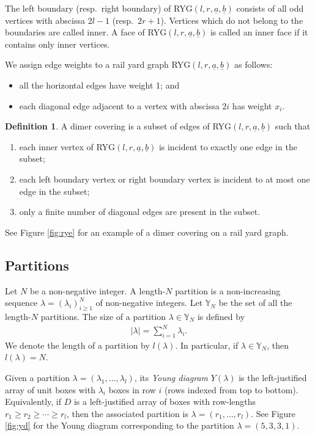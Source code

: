 \documentclass[11pt]{amsart}
\theoremstyle{plain}
\theoremstyle{definition}
\newtheorem{definition}[theorem]{Definition}
\theoremstyle{remark}
\renewcommand\ell{l}
\newcommand\YY{\mathbb{Y}}
\numberwithin{equation}{section}
\numberwithin{theorem}{section}
\numberwithin{figure}{section}
\begin{document}
The left boundary (resp.\ right boundary) of RYG$ (l,r,\underline{a},\underline{b})$ consists of all odd vertices with abscissa $2l-1$ (resp.\ $2r+1$). Vertices which do not belong to the boundaries are called inner. A face of RYG$(l,r,\underline{a},\underline{b})$ is called an inner face if it contains only inner vertices.

We assign edge weights to a rail yard graph RYG$(l,r,\underline{a},\underline{b})$ as follows:
\begin{itemize}
    \item all the horizontal edges have weight 1; and
    \item each diagonal edge adjacent to a vertex with abscissa $2i$ has weight $x_i$.
\end{itemize}



\begin{definition}
A dimer covering is a subset of edges of RYG$(l,r,\underline{a},\underline{b})$ such that
\begin{enumerate}
\item each inner vertex of RYG$(l,r,\underline{a},\underline{b})$ is incident to exactly one edge in the subset;
\item each left boundary vertex or right boundary vertex is incident to at most one edge in the subset;
\item only a finite number of diagonal edges are present in the subset.
\end{enumerate}
\end{definition}

See Figure \ref{fig:rye} for an example of a dimer covering on a rail yard graph. 


\subsection{Partitions}

Let $N$ be a non-negative integer. A length-$N$ partition is a non-increasing sequence $\lambda=(\lambda_i)_{i\geq 1}^{N}$ of non-negative integers. Let $\mathbb{Y}_N$ be the set of all the length-$N$ partitions. The size of a partition $\lambda\in \YY_N$ is defined by
\begin{eqnarray*}
|\lambda|=\sum_{i=1}^{N}\lambda_i.
\end{eqnarray*}
We denote the length of a partition by $l(\lambda)$. In particular, if $\lambda\in \YY_N$, then $l(\lambda)=N$. 

Given a partition $\lambda=(\lambda_1,\ldots,\lambda_\ell)$, its
\emph{Young diagram} $Y(\lambda)$ is the left-justified array of unit boxes with
$\lambda_i$ boxes in row $i$ (rows indexed from top to bottom).
Equivalently, if $D$ is a left-justified array of boxes with row-lengths
$r_1\ge r_2\ge\cdots\ge r_\ell$, then the associated partition is
$\lambda=(r_1,\ldots,r_\ell)$. See Figure \ref{fig:yd} for the Young diagram corresponding to the partition $\lambda=(5,3,3,1)$.
\end{document}

